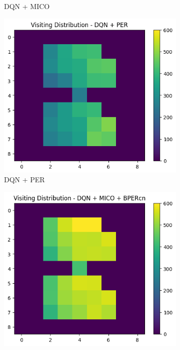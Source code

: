 \begin{figure}[h]
\begin{subfigure}{0.45\textwidth}
        \caption{DQN + MICO}
        \label{fig:uniform_weighting}
    \end{subfigure}
    \hspace*{\fill} %
    \vfill
    \begin{subfigure}{0.32\textwidth}
        \centering
        \includegraphics[width=\linewidth]{Results/grid_world/visitation_distribution_dqn_per.png}
        \caption{DQN + PER}
        \label{fig:uniform_weighting_2}
    \end{subfigure}
    \hfill
    \begin{subfigure}{0.32\textwidth}
        \centering
        \includegraphics[width=\linewidth]{Results/grid_world/visitation_distribution_dqn_mico_bpercn.png}

\end{subfigure}
\end{figure}
